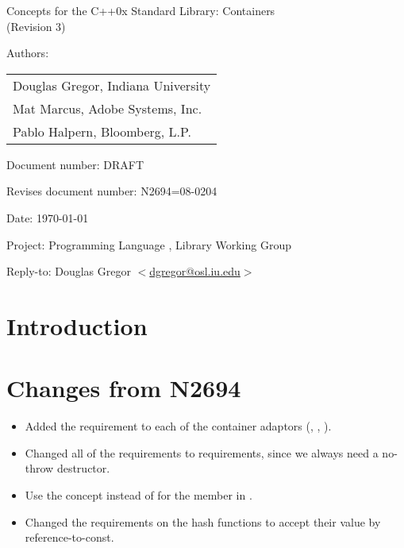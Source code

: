 \documentclass[american,twoside]{book}
\begin{document}
\raggedbottom

\begin{titlepage}
\begin{center}
\huge
Concepts for the C++0x Standard Library: Containers\\
(Revision 3)
\end{center}

\normalsize

\vspace{0.5in}
\par\noindent Authors: 
\begin{tabular}[t]{l}
Douglas Gregor, Indiana University \\
Mat Marcus, Adobe Systems, Inc.\\
Pablo Halpern,  Bloomberg, L.P.
\end{tabular}\vspace{-6pt}
\par\noindent Document number: DRAFT\vspace{-6pt}
\par\noindent Revises document number: N2694=08-0204\vspace{-6pt}
\par\noindent Date: \today\vspace{-6pt}
\par\noindent Project: Programming Language \Cpp{}, Library Working Group\vspace{-6pt}
\par\noindent Reply-to: Douglas Gregor $<$\href{mailto:dgregor@osl.iu.edu}{dgregor@osl.iu.edu}$>$\vspace{-6pt}

\section*{Introduction}

\section*{Changes from N2694}
\begin{itemize}
\item Added the  requirement to each
  of the container adaptors (, ,
  ).
\item Changed all of the  requirements to
   requirements, since we always need a no-throw
  destructor.
\item Use the  concept instead of
   for the  member in .
\item Changed the  requirements on the hash functions
  to accept their value by reference-to-const.
\end{itemize}

\end{titlepage}
\end{document}
